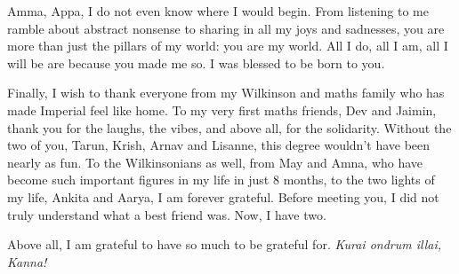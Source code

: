 Amma, Appa, I do not even know where I would begin. From listening to me ramble about abstract nonsense to sharing in all my joys and sadnesses, you are more than just the pillars of my world: you are my world. All I do, all I am, all I will be are because you made me so. I was blessed to be born to you.

Finally, I wish to thank everyone from my Wilkinson and maths family who has made Imperial feel like home. To my very first maths friends, Dev and Jaimin, thank you for the laughs, the vibes, and above all, for the solidarity. Without the two of you, Tarun, Krish, Arnav and Lisanne, this degree wouldn't have been nearly as fun. To the Wilkinsonians as well, from May and Amna, who have become such important figures in my life in just 8 months, to the two lights of my life, Ankita and Aarya, I am forever grateful. Before meeting you, I did not truly understand what a best friend was. Now, I have two.

Above all, I am grateful to have so much to be grateful for. \textit{Kurai ondrum illai, Kanna!}